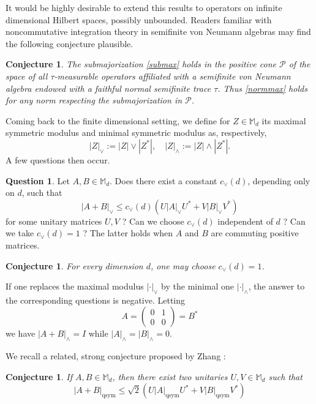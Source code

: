 \documentclass[12pt,reqno]{article}
\newtheorem{conjecture}[theorem]{Conjecture}
\theoremstyle{definition}
\newtheorem{question}[theorem]{Question}
\theoremstyle{remark}
\numberwithin{equation}{section}
\def\bM{\mathbb{M}}
\newcommand{\qsym}{\mathrm{qsym}}
\begin{document}
It would be highly desirable to extend this results to operators on infinite dimensional Hilbert spaces, possibly unbounded. Readers familiar with noncommutative integration theory in semifinite von Neumann algebras may find the following conjecture plausible.

\begin{conjecture}
The submajorization \eqref{submax} holds  in the positive cone $\mathcal{P}$ of the space of all $\tau$-measurable operators 
affiliated with a semifinite von Neumann algebra endowed with a faithful normal semifinite trace $\tau$.
Thus \eqref{normmax}  holds  for any norm respecting the submajorization in  $\mathcal{P}$.
\end{conjecture}



Coming back to the finite dimensional setting, we define for $Z\in\bM_d$ its maximal symmetric modulus and minimal symmetric modulus as, respectively,
$$
|Z|_{\vee} :=|Z|\vee |Z^*|, \quad |Z|_{\wedge} :=|Z|\wedge |Z^*|.
$$
A few  questions then occur.

\begin{question} Let $A,B\in\bM_d$. Does there exist a constant $c_{\vee}(d)$, depending only on $d$, such that  
$$
|A+B|_{\vee} \le c_{\vee}(d) \left(U|A|_{\vee} U^* + V|B|_{\vee}V^*\right)
$$
for some unitary matrices $U,V$ ? Can we choose $c_{\vee}(d)$ independent of $d$ ? 
 Can we take $c_{\vee}(d)=1$ ? The latter holds when $A$ and $B$ are commuting positive matrices.
\end{question}
 



\begin{conjecture} For every dimension $d$, one may choose $c_{\vee}(d)=1$.
\end{conjecture}


If one replaces the maximal modulus $|\cdot|_{\vee}$ by the minimal one $|\cdot|_{\wedge}$, the answer to the corresponding questions is negative. Letting
$$
A=\begin{pmatrix} 0&1 \\ 0&0\end{pmatrix}=B^*
$$
we have $|A+B|_{\wedge}=I$ while $|A|_{\wedge}=|B|_{\wedge}=0$.

We recall  a  related,  strong conjecture proposed by Zhang \cite{Z2}:

\begin{conjecture} If $A,B\in\bM_d$, then there exist two unitaries $U,V\in\bM_d$ such that
$$
|A+B|_{\qsym} \le \sqrt{2} \left(U|A|_{\qsym} U^* + V|B|_{\qsym}V^*\right)
$$
\end{conjecture}
\end{document}
